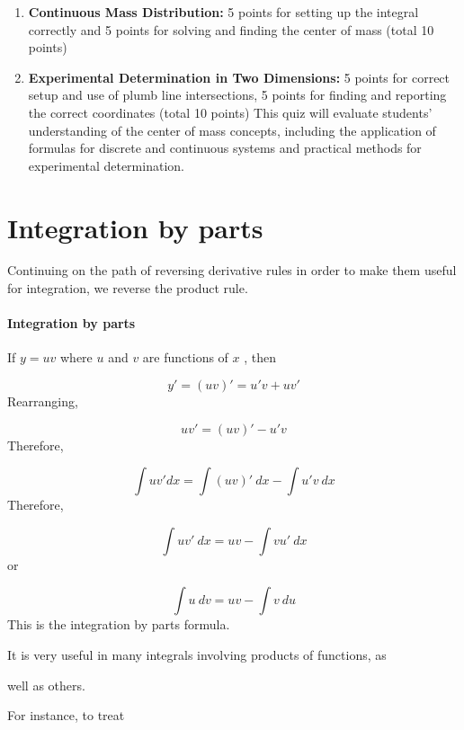 \begin{enumerate}
    \item \textbf{Continuous Mass Distribution:} 5 points for setting up the integral correctly and 5 points for solving and finding the center of mass (total 10 points)
    \item \textbf{Experimental Determination in Two Dimensions:} 5 points for correct setup and use of plumb line intersections, 5 points for finding and reporting the correct coordinates (total 10 points) This quiz will evaluate students' understanding of the center of mass concepts, including the application of formulas for discrete and continuous systems and practical methods for experimental determination.
\end{enumerate}

\section{Integration by parts}
\label{sec:integration-by-parts}

Continuing on the path of reversing derivative rules in order to make them useful for integration, we reverse the product rule.



\paragraph{Integration by parts}



If $y=uv$ where $u$ and $v$ are functions of $x$ , then



$$y'=(uv)'=u'v+uv'$$ Rearranging,



$$uv'=(uv)'-u'v$$ Therefore,



$$\int uv'dx=\int (uv)'\ dx-\int u'v\ dx$$ Therefore,



$$\int uv'\ dx=uv-\int vu'\ dx$$ or



$$\int u\ dv=uv-\int v\ du$$ This is the integration by parts formula.

It is very useful in many integrals involving products of functions, as

well as others.



For instance, to treat



